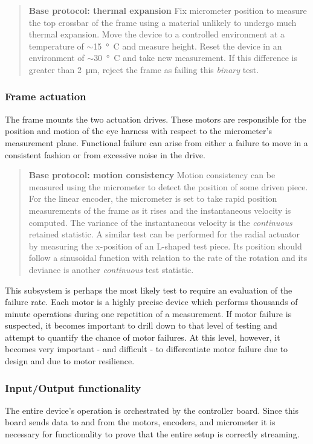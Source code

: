 \documentclass{article}
\begin{document}
\begin{quotation}
  \textbf{Base protocol: thermal expansion} Fix micrometer position to   measure the top crossbar of the frame using a material unlikely to   undergo much thermal expansion. Move the device to a controlled   environment at a temperature of $\sim$\SI{15}{\degree C} and measure   height. Reset the device in an environment of $\sim$\SI{30}{\degree     C} and take new measurement. If this difference is greater than   \SI{2}{\micro m}, reject the frame as failing this \textit{binary} test.
\end{quotation}


\subsubsection{Frame actuation}
The frame mounts the two actuation drives. These motors are responsible for the position and motion of the eye harness with respect to the micrometer's measurement plane. Functional failure can arise from either a failure to move in a consistent fashion or from excessive noise in the drive.

\begin{quotation}
  \textbf{Base protocol: motion consistency} Motion consistency can be measured using the micrometer to detect the position of some driven piece. For the linear encoder, the micrometer is set to take rapid position measurements of the frame as it rises and the instantaneous velocity is computed. The variance of the instantaneous velocity is the \textit{continuous} retained statistic. A similar test can be performed for the radial actuator by measuring the x-position of an L-shaped test piece. Its position should follow a sinusoidal function with relation to the rate of the rotation and its deviance is another \textit{continuous} test statistic.
\end{quotation}

This subsystem is perhaps the most likely test to require an evaluation of the failure rate. Each motor is a highly precise device which performs thousands of minute operations during one repetition of a measurement. If motor failure is suspected, it becomes important to drill down to that level of testing and attempt to quantify the chance of motor failures. At this level, however, it becomes very important - and difficult -  to differentiate motor failure due to design and due to motor resilience.

\subsubsection{Input/Output functionality}
The entire device's operation is orchestrated by the controller board. Since this board sends data to and from the motors, encoders, and micrometer it is necessary for functionality to prove that the entire setup is correctly streaming.
\end{document}
